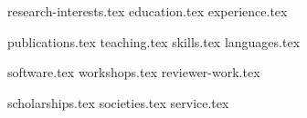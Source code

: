 \documentclass[letterpaper,11pt]{article}
\begin{document}



{research-interests.tex}
{education.tex}
{experience.tex}

\pagebreak

{publications.tex}
{teaching.tex}
\sidebyside
    {{skills.tex}}
    {{languages.tex}}

\pagebreak

{software.tex}
{workshops.tex}
{reviewer-work.tex}

\pagebreak

{scholarships.tex}
{societies.tex}
{service.tex}
\end{document}

